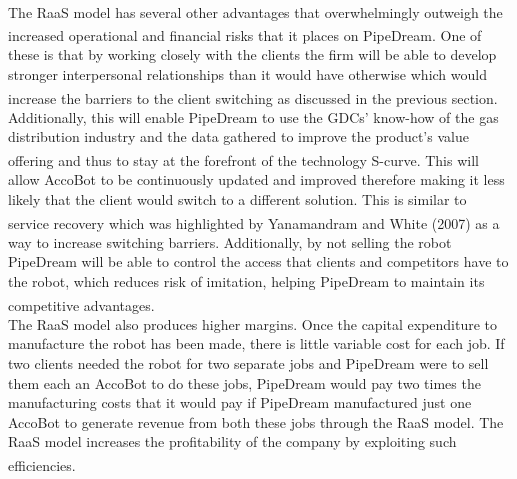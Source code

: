 \documentclass[11pt]{article}		%
\newcommand{\supercite}[1]{\textsuperscript{\cite{#1}}}		%
\begin{document}
            \\
            \hspace*{2ex}The RaaS model has several other advantages that overwhelmingly outweigh the increased operational and financial risks that it places on PipeDream\supercite{RaaS}. One of these is that by working closely with the clients the firm will be able to develop stronger interpersonal relationships than it would have otherwise which would increase the barriers to the client switching\supercite{B2Brelations} as discussed in the previous section. Additionally, this will enable PipeDream to use the GDCs' know-how of the gas distribution industry and the data gathered to improve the product’s value offering and thus to stay at the forefront of the technology S-curve\supercite{Barney}. This will allow AccoBot to be continuously updated and improved therefore making it less likely that the client would switch to a different solution. This is similar to service recovery which was highlighted by Yanamandram and White (2007)\supercite{customers} as a way to increase switching barriers. Additionally, by not selling the robot PipeDream will be able to control the access that clients and competitors have to the robot, which reduces risk of imitation, helping PipeDream to maintain its competitive advantages\supercite{Barney}.
            \\
            \hspace*{2ex}The RaaS model also produces higher margins. Once the capital expenditure to manufacture the robot has been made, there is little variable cost for each job. If two clients needed the robot for two separate jobs and PipeDream were to sell them each an AccoBot to do these jobs, PipeDream would pay two times the manufacturing costs that it would pay if PipeDream manufactured just one AccoBot to generate revenue from both these jobs through the RaaS model. The RaaS model increases the profitability of the company by exploiting such efficiencies\supercite{monetise_RaaS}.
\end{document}

